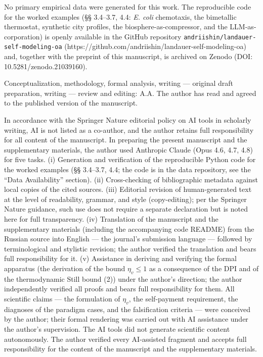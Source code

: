 \documentclass[pdflatex,sn-mathphys-ay]{sn-jnl}
\begin{document}
No primary empirical data were generated for this work. The reproducible code for the worked examples (§§ 3.4--3.7, 4.4: \emph{E. coli} chemotaxis, the bimetallic thermostat, synthetic city profiles, the biosphere-as-compressor, and the LLM-as-corporation) is openly available in the GitHub repository \texttt{andriishin/landauer-self-modeling-oa} (https://github.com/andriishin/landauer-self-modeling-oa) and, together with the preprint of this manuscript, is archived on Zenodo (DOI: 10.5281/zenodo.21039160).

Conceptualization, methodology, formal analysis, writing --- original draft preparation, writing --- review and editing: A.A. The author has read and agreed to the published version of the manuscript.

In accordance with the Springer Nature editorial policy on AI tools in scholarly writing, AI is not listed as a co-author, and the author retains full responsibility for all content of the manuscript. In preparing the present manuscript and the supplementary materials, the author used Anthropic Claude (Opus 4.6, 4.7, 4.8) for five tasks. (i) Generation and verification of the reproducible Python code for the worked examples (§§ 3.4--3.7, 4.4; the code is in the data repository, see the ``Data Availability'' section). (ii) Cross-checking of bibliographic metadata against local copies of the cited sources. (iii) Editorial revision of human-generated text at the level of readability, grammar, and style (copy-editing); per the Springer Nature guidance, such use does not require a separate declaration but is noted here for full transparency. (iv) Translation of the manuscript and the supplementary materials (including the accompanying code README) from the Russian source into English --- the journal's submission language --- followed by terminological and stylistic revision; the author verified the translation and bears full responsibility for it. (v) Assistance in deriving and verifying the formal apparatus (the derivation of the bound \(\eta_v \le 1\) as a consequence of the DPI and of the thermodynamic Still bound (2)) under the author's direction; the author independently verified all proofs and bears full responsibility for them. All scientific claims --- the formulation of \(\eta_v\), the self-payment requirement, the diagnoses of the paradigm cases, and the falsification criteria --- were conceived by the author; their formal rendering was carried out with AI assistance under the author's supervision. The AI tools did not generate scientific content autonomously. The author verified every AI-assisted fragment and accepts full responsibility for the content of the manuscript and the supplementary materials.


\nocite{*}

\end{document}
